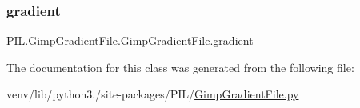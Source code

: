 \subsubsection{\texorpdfstring{gradient}{gradient}}
{\footnotesize\ttfamily P\+I\+L.\+Gimp\+Gradient\+File.\+Gimp\+Gradient\+File.\+gradient}



The documentation for this class was generated from the following file\+:\begin{DoxyCompactItemize}
\item 
venv/lib/python3./site-\/packages/\+P\+I\+L/\hyperlink{GimpGradientFile_8py}{Gimp\+Gradient\+File.\+py}\end{DoxyCompactItemize}
